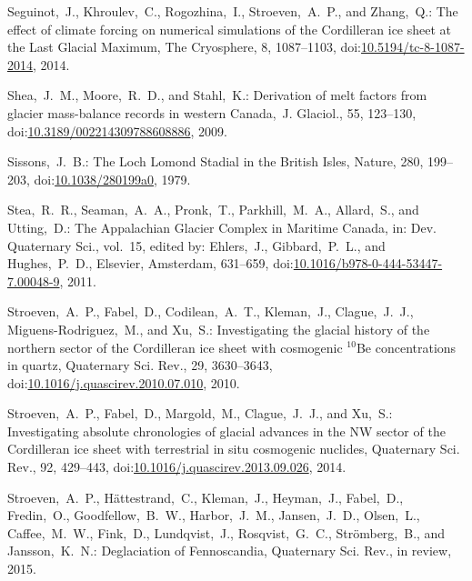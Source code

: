 \documentclass[tc, manuscript]{copernicus}
\begin{document}
\begin{thebibliography}{114}
 Seguinot,~J., Khroulev,~C., Rogozhina,~I., Stroeven,~A.~P., and Zhang,~Q.: The effect of climate forcing on numerical simulations of the Cordilleran ice sheet at the Last Glacial Maximum, The Cryosphere, 8, 1087--1103,
doi:\href{http://dx.doi.org/10.5194/tc-8-1087-2014}{10.5194/tc-8-1087-2014}, 2014.


Shea,~J.~M., Moore,~R.~D., and Stahl,~K.: Derivation of melt factors from glacier mass-balance records in western Canada,~J. Glaciol., 55, 123--130,
doi:\href{http://dx.doi.org/10.3189/002214309788608886}{10.3189/002214309788608886}, 2009.


Sissons,~J.~B.: The Loch Lomond Stadial in the British Isles, Nature, 280, 199--203,
doi:\href{http://dx.doi.org/10.1038/280199a0}{10.1038/280199a0}, 1979.


Stea,~R.~R., Seaman,~A.~A., Pronk,~T., Parkhill,~M.~A., Allard,~S., and Utting,~D.: The Appalachian Glacier Complex in Maritime Canada, in:   Dev. Quaternary Sci., vol.~15, edited by: Ehlers,~J., Gibbard,~P.~L., and Hughes,~P.~D., Elsevier, Amsterdam, 631--659,
doi:\href{http://dx.doi.org/10.1016/b978-0-444-53447-7.00048-9}{10.1016/b978-0-444-53447-7.00048-9}, 2011.


Stroeven,~A.~P., Fabel,~D., Codilean,~A.~T., Kleman,~J., Clague,~J.~J., Miguens-Rodriguez,~M., and Xu,~S.: Investigating the glacial history of the northern sector of the Cordilleran ice sheet with cosmogenic $^{10}$Be concentrations in quartz, Quaternary Sci. Rev., 29, 3630--3643,
doi:\href{http://dx.doi.org/10.1016/j.quascirev.2010.07.010}{10.1016/j.quascirev.2010.07.010}, 2010.


Stroeven,~A.~P., Fabel,~D., Margold,~M., Clague,~J.~J., and Xu,~S.: Investigating absolute chronologies of glacial advances in the {NW} sector of the Cordilleran ice sheet with terrestrial in situ cosmogenic nuclides, Quaternary Sci. Rev., 92, 429--443,
doi:\href{http://dx.doi.org/10.1016/j.quascirev.2013.09.026}{10.1016/j.quascirev.2013.09.026}, 2014.


Stroeven,~A.~P., H{\"a}ttestrand,~C., Kleman,~J., Heyman,~J., Fabel,~D.,
Fredin,~O., Goodfellow,~B.~W., Harbor,~J.~M., Jansen,~J.~D., Olsen,~L.,
Caffee,~M.~W., Fink,~D., Lundqvist,~J., Rosqvist,~G.~C., Str\"omberg,~B., and
Jansson,~K.~N.: Deglaciation of Fennoscandia, Quaternary Sci. Rev., in
review, 2015.



\end{thebibliography}
\end{document}

